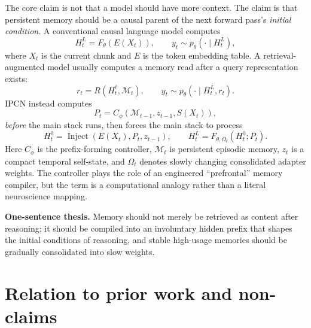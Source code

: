 \documentclass[11pt]{article}
\newcommand{\Mem}{\mathcal{M}}
\begin{document}
The core claim is not that a model should have more context. The claim is that persistent memory should be a causal parent of the next forward pass's \emph{initial condition}. A conventional causal language model computes
\begin{equation}
    H_t^L = F_\theta(E(X_t)), \qquad y_t \sim p_\theta(\cdot \mid H_t^L),
\end{equation}
where \(X_t\) is the current chunk and \(E\) is the token embedding table. A retrieval-augmented model usually computes a memory read after a query representation exists:
\begin{equation}
    r_t = R(H_t^\ell, \Mem_t), \qquad y_t \sim p_\theta(\cdot \mid H_t^L, r_t).
\end{equation}
IPCN instead computes
\begin{equation}
    P_t = C_\phi(\Mem_{t-1}, z_{t-1}, S(X_t)),
\end{equation}
\emph{before} the main stack runs, then forces the main stack to process
\begin{equation}
    H_t^0 = \operatorname{Inject}(E(X_t), P_t, z_{t-1}), \qquad H_t^L = F_{\theta,\Omega_t}(H_t^0; P_t).
\end{equation}
Here \(C_\phi\) is the prefix-forming controller, \(\Mem_t\) is persistent episodic memory, \(z_t\) is a compact temporal self-state, and \(\Omega_t\) denotes slowly changing consolidated adapter weights. The controller plays the role of an engineered ``prefrontal'' memory compiler, but the term is a computational analogy rather than a literal neuroscience mapping.

\begin{specbox}
\textbf{One-sentence thesis.} Memory should not merely be retrieved as content after reasoning; it should be compiled into an involuntary hidden prefix that shapes the initial conditions of reasoning, and stable high-usage memories should be gradually consolidated into slow weights.
\end{specbox}

\section{Relation to prior work and non-claims}
\end{document}
